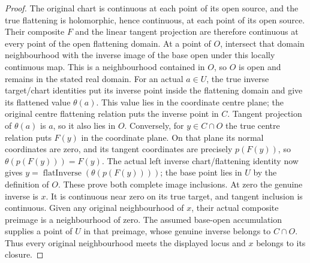 \begin{proof}
The original chart is continuous at each point of its open source, and the
true flattening is holomorphic, hence continuous, at each point of its open
source. Their composite $F$ and the linear tangent projection are therefore
continuous at every point of the open flattening domain. At a point of $O$,
intersect that domain neighbourhood with the inverse image of the base open
under this locally continuous map. This is a neighbourhood contained in $O$,
so $O$ is open and remains in the stated real domain.
For an actual $a\in U$, the true inverse target/chart identities put its
inverse point inside the flattening domain and give its flattened value
$\theta(a)$. This value lies in the coordinate centre plane; the original
centre flattening relation puts the inverse point in $C$. Tangent projection
of $\theta(a)$ is $a$, so it also lies in $O$. Conversely, for $y\in C\cap O$
the true centre relation puts $F(y)$ in the coordinate plane. On that plane
its normal coordinates are zero, and its tangent coordinates are precisely
$p(F(y))$, so $\theta(p(F(y)))=F(y)$. The actual left inverse chart/flattening
identity now gives $y=\operatorname{flatInverse}(\theta(p(F(y))))$; the base
point lies in $U$ by the definition of $O$. These prove both complete image
inclusions. At zero the genuine inverse is $x$. It is continuous near zero
on its true target, and tangent inclusion is continuous. Given any original
neighbourhood of $x$, their actual composite preimage is a neighbourhood of
zero. The assumed base-open accumulation supplies a point of $U$ in that
preimage, whose genuine inverse belongs to $C\cap O$. Thus every original
neighbourhood meets the displayed locus and $x$ belongs to its closure.
\end{proof}

